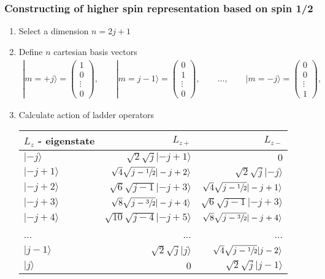 \documentclass[../main.tex]{subfiles}
\begin{document}
\subsubsection{Constructing of higher spin representation based  on spin 1/2}
\begin{enumerate}
\item Select a dimension $n=2j+1$
\item Define $n$ cartesian basis vectors
\begin{align}
|m=+j\rangle=\left(\begin{matrix}
1 \\
0 \\
\vdots\\
0
\end{matrix}
\right), \qquad
|m=j-1\rangle=\left(\begin{matrix}
0 \\
1 \\
\vdots\\
0
\end{matrix}
\right), \qquad ...,\qquad
|m=-j\rangle=\left(\begin{matrix}
0 \\
0 \\
\vdots\\
1
\end{matrix}
\right), \qquad
\end{align}
\item Calculate action of ladder operators
\begin{center}
\begin{tabular}{ l r r}
\hline\hline
$L_z$ - eigenstate & $L_{z+}$     & $L_{z-}$\\ \hline\hline
$|-j\rangle$   & $\sqrt{2}\sqrt{j}|-j+1\rangle$ & $0$ \\
$|-j+1\rangle$ & $\sqrt{4}\sqrt{j-\sfrac{1}{2}}|-j+2\rangle$ & $\sqrt{2}\sqrt{j}|-j\rangle$\\
$|-j+2\rangle$ & $\sqrt{6}\sqrt{j-1}|-j+3\rangle$ & $\sqrt{4}\sqrt{j-\sfrac{1}{2}}|-j+1\rangle$\\
$|-j+3\rangle$ & $\sqrt{8}\sqrt{j-\sfrac{3}{2}}|-j+4\rangle$ & $\sqrt{6}\sqrt{j-1}|-j+3\rangle$\\
$|-j+4\rangle$ & $\sqrt{10}\sqrt{j-4}|-j+5\rangle$ & $\sqrt{8}\sqrt{j-\sfrac{3}{2}}|-j+4\rangle$\\
... & ... & ...\\
$|j-1\rangle$  & $\sqrt{2}\sqrt{j}|j\rangle$ & $\sqrt{4}\sqrt{j-\sfrac{1}{2}}|j-2\rangle$\\
$|j\rangle$    & $0$ & $\sqrt{2}\sqrt{j}|j-1\rangle$\\
\end{tabular}
\end{center}


\end{enumerate}
\end{document}
